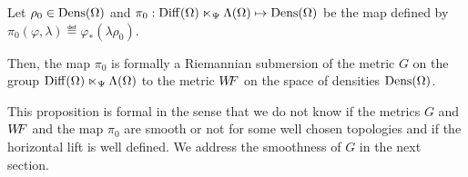 \begin{proposition}\label{thm:Submersion}
Let $\rho_0 \in \operatorname{Dens}(\Omega)$ and $\pi_0:\operatorname{Diff}(\Omega) \ltimes_\Psi \Lambda(\Omega) \mapsto \operatorname{Dens}(\Omega)$ be the map defined by $\pi_0(\varphi, \lambda) \eqdef \varphi_*(\lambda \rho_0)$.

Then, the map $\pi_0$ is formally a Riemannian submersion of the metric $G$ on the group $\operatorname{Diff}(\Omega) \ltimes_\Psi \Lambda(\Omega)$ to the metric $W\! \! F$ on the space of densities $\operatorname{Dens}(\Omega)$.
\end{proposition}

This proposition is  formal in the sense that we do not know if the metrics $G$ and $W\! \! F$ and the map $\pi_0$ are smooth or not for some well chosen topologies and if the horizontal lift is well defined. We address the smoothness of $G$ in the next section.

%

